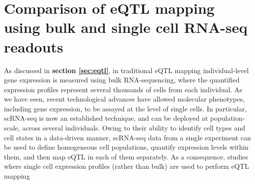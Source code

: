 
\chapter{Comparison of eQTL mapping using bulk and single cell RNA-seq readouts}
\label{chapter3}

As discussed in \textbf{section 
\ref{sec:eqtl}},
in traditional 
eQTL
mapping 
individual-level 
gene expression 
is
measured using bulk RNA-sequencing, where 
the quantified 
expression profiles represent
several thousands of cells from each individual.
As we have seen, recent technological advances 
have allowed molecular phenotypes, including gene expression, to be assayed at the level of single cells.
In particular, 
scRNA-seq
is now an established technique, 
and can be deployed at population-scale, across several individuals.
Owing to their ability to identify cell types and cell states in a data-driven manner,
scRNA-seq
data from a single experiment can be used to define homogeneous cell populations, quantify expression levels within them, and then map eQTL in each of them separately.
As a consequence, studies where single cell expression profiles (rather than bulk) are used to perform
eQTL
mapping 
